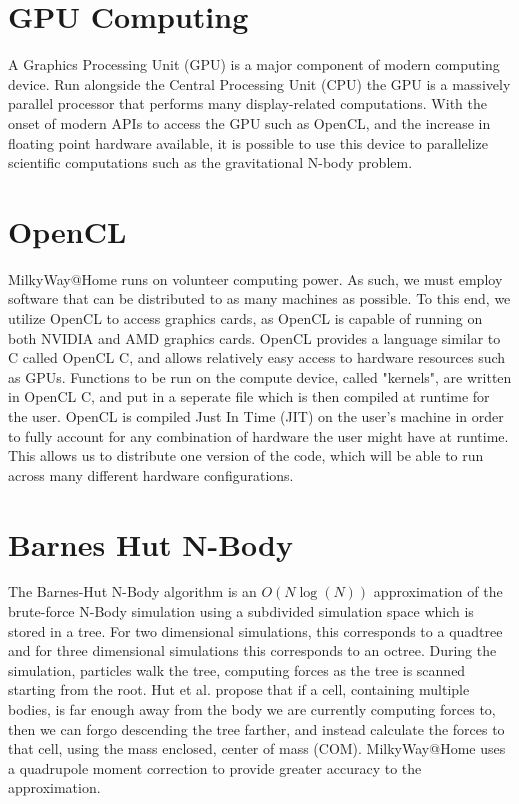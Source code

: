 \documentclass{thesis}
\begin{document}
\section{GPU Computing}
A Graphics Processing Unit (GPU) is a major component of modern computing device. Run alongside the Central Processing Unit (CPU) the GPU is a massively parallel processor that performs many display-related computations. With the onset of modern APIs to access the GPU such as OpenCL, and the increase in floating point hardware available, it is possible to use this device to parallelize scientific computations such as the gravitational N-body problem.
\section{OpenCL}
MilkyWay@Home runs on volunteer computing power. As such, we must employ software that can be distributed to as many machines as possible. To this end, we utilize OpenCL to access graphics cards, as OpenCL is capable of running on both NVIDIA and AMD graphics cards. OpenCL provides a language similar to C called OpenCL C, and allows relatively easy access to hardware resources such as GPUs. Functions to be run on the compute device, called "kernels", are written in OpenCL C, and put in a seperate file which is then compiled at runtime for the user. OpenCL is compiled Just In Time (JIT) on the user's machine in order to fully account for any combination of hardware the user might have at runtime. This allows us to distribute one version of the code, which will be able to run across many different hardware configurations.
\section{Barnes Hut N-Body}
The Barnes-Hut N-Body algorithm \cite{BarnesHut:1986} is an $O(N\log(N))$ approximation of the brute-force N-Body simulation using a subdivided simulation space which is stored in a tree. For two dimensional simulations, this corresponds to a quadtree and for three dimensional simulations this corresponds to an octree. During the simulation, particles walk the tree, computing forces as the tree is scanned starting from the root. Hut et al. propose that if a cell, containing multiple bodies, is far enough away from the body we are currently computing forces to, then we can forgo descending the tree farther, and instead calculate the forces to that cell, using the mass enclosed, center of mass (COM). MilkyWay@Home uses a quadrupole moment correction to provide greater accuracy to the approximation.
\end{document}
